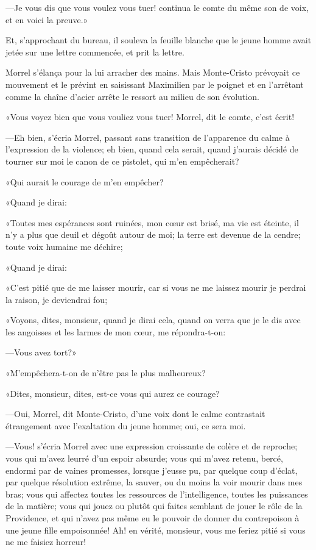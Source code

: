 —Je vous dis que vous voulez vous tuer! continua le comte du même son de voix, et en voici la preuve.» 

Et, s'approchant du bureau, il souleva la feuille blanche que le jeune homme avait jetée sur une lettre commencée, et prit la lettre. 

Morrel s'élança pour la lui arracher des mains. Mais Monte-Cristo prévoyait ce mouvement et le prévint en saisissant Maximilien par le poignet et en l'arrêtant comme la chaîne d'acier arrête le ressort au milieu de son évolution. 

«Vous voyez bien que vous vouliez vous tuer! Morrel, dit le comte, c'est écrit! 

—Eh bien, s'écria Morrel, passant sans transition de l'apparence du calme à l'expression de la violence; eh bien, quand cela serait, quand j'aurais décidé de tourner sur moi le canon de ce pistolet, qui m'en empêcherait? 

«Qui aurait le courage de m'en empêcher? 

«Quand je dirai: 

«Toutes mes espérances sont ruinées, mon cœur est brisé, ma vie est éteinte, il n'y a plus que deuil et dégoût autour de moi; la terre est devenue de la cendre; toute voix humaine me déchire; 

«Quand je dirai: 

«C'est pitié que de me laisser mourir, car si vous ne me laissez mourir je perdrai la raison, je deviendrai fou; 

«Voyons, dites, monsieur, quand je dirai cela, quand on verra que je le dis avec les angoisses et les larmes de mon cœur, me répondra-t-on: 

—Vous avez tort?» 

«M'empêchera-t-on de n'être pas le plus malheureux? 

«Dites, monsieur, dites, est-ce vous qui aurez ce courage? 

—Oui, Morrel, dit Monte-Cristo, d'une voix dont le calme contrastait étrangement avec l'exaltation du jeune homme; oui, ce sera moi. 

—Vous! s'écria Morrel avec une expression croissante de colère et de reproche; vous qui m'avez leurré d'un espoir absurde; vous qui m'avez retenu, bercé, endormi par de vaines promesses, lorsque j'eusse pu, par quelque coup d'éclat, par quelque résolution extrême, la sauver, ou du moins la voir mourir dans mes bras; vous qui affectez toutes les ressources de l'intelligence, toutes les puissances de la matière; vous qui jouez ou plutôt qui faites semblant de jouer le rôle de la Providence, et qui n'avez pas même eu le pouvoir de donner du contrepoison à une jeune fille empoisonnée! Ah! en vérité, monsieur, vous me feriez pitié si vous ne me faisiez horreur! 

